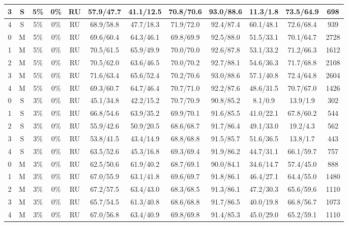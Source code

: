 \begin{table*}
{\begin{tabular}{|c|c|c|c|c||c|c|c|c|c|c||c|}
3 & S & 5\% & 0\% & RU & 57.9/47.7 & 41.1/12.5 & 70.8/70.6 & 93.0/88.6 & 11.3/1.8 & 73.5/64.9 & 698 \\ \hline
4 & S & 5\% & 0\% & RU & 68.9/58.8 & 47.7/18.3 & 71.9/72.0 & 92.4/87.4 & 60.1/48.1 & 72.6/68.4 & 939 \\ \hline
0 & M & 5\% & 0\% & RU & 69.6/60.4 & 64.3/46.1 & 69.8/69.9 & 92.5/88.0 & 51.5/33.1 & 70.1/64.7 & 2728 \\ \hline
1 & M & 5\% & 0\% & RU & 70.5/61.5 & 65.9/49.9 & 70.0/70.0 & 92.6/87.8 & 53.1/33.2 & 71.2/66.3 & 1612 \\ \hline
2 & M & 5\% & 0\% & RU & 70.5/62.0 & 63.6/46.5 & 70.0/70.2 & 92.7/88.1 & 54.6/36.3 & 71.7/68.8 & 2108 \\ \hline
3 & M & 5\% & 0\% & RU & 71.6/63.4 & 65.6/52.4 & 70.2/70.6 & 93.0/88.6 & 57.1/40.8 & 72.4/64.8 & 2604 \\ \hline
4 & M & 5\% & 0\% & RU & 69.3/60.7 & 64.7/46.4 & 70.7/71.0 & 92.2/87.6 & 48.6/31.5 & 70.7/67.0 & 1426 \\ \hline
0 & S & 3\% & 0\% & RU & 45.1/34.8 & 42.2/15.2 & 70.7/70.9 & 90.8/85.2 & 8.1/0.9 & 13.9/1.9 & 302 \\ \hline
1 & S & 3\% & 0\% & RU & 66.8/54.6 & 63.9/35.2 & 69.9/70.1 & 91.6/85.5 & 41.0/22.1 & 67.8/60.2 & 544 \\ \hline
2 & S & 3\% & 0\% & RU & 55.9/42.6 & 50.9/20.5 & 68.6/68.7 & 91.7/86.4 & 49.1/33.0 & 19.2/4.3 & 562 \\ \hline
3 & S & 3\% & 0\% & RU & 53.8/41.5 & 43.4/14.9 & 68.8/68.8 & 91.5/85.7 & 51.6/36.5 & 13.8/1.7 & 443 \\ \hline
4 & S & 3\% & 0\% & RU & 63.5/52.6 & 45.3/16.8 & 69.3/69.4 & 91.9/86.2 & 44.7/31.1 & 66.1/59.7 & 757 \\ \hline
0 & M & 3\% & 0\% & RU & 62.5/50.6 & 61.9/40.2 & 68.7/69.1 & 90.0/84.1 & 34.6/14.7 & 57.4/45.0 & 888 \\ \hline
1 & M & 3\% & 0\% & RU & 67.0/55.9 & 63.1/41.8 & 69.6/69.7 & 91.8/86.1 & 46.4/27.1 & 64.4/55.0 & 1480 \\ \hline
2 & M & 3\% & 0\% & RU & 67.2/57.5 & 63.4/43.0 & 68.3/68.5 & 91.3/86.1 & 47.2/30.3 & 65.6/59.6 & 1110 \\ \hline
3 & M & 3\% & 0\% & RU & 65.7/54.5 & 61.3/40.8 & 68.6/68.8 & 91.7/86.5 & 40.0/19.8 & 66.8/56.7 & 1073 \\ \hline
4 & M & 3\% & 0\% & RU & 67.0/56.8 & 63.4/40.9 & 69.8/69.8 & 91.4/85.3 & 45.0/29.0 & 65.2/59.1 & 1110 \\ \hline
\end{tabular}
}
\end{table*}



